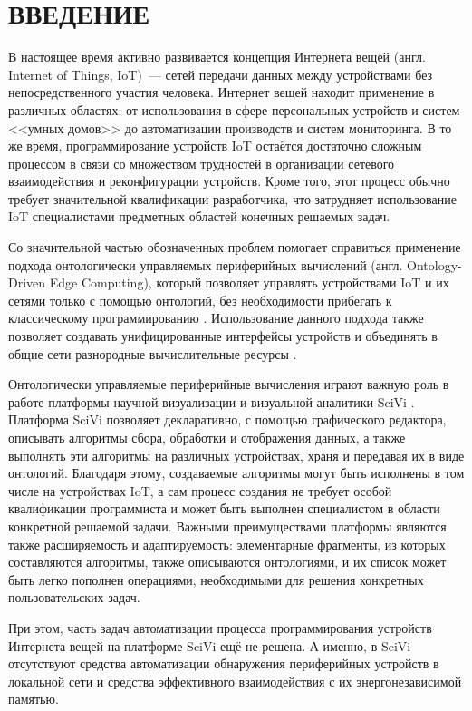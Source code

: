 \chapter*{ВВЕДЕНИЕ}

В настоящее время активно развивается концепция Интернета вещей (англ. Internet of Things, IoT)~--- сетей передачи данных между устройствами без непосредственного участия человека.
Интернет вещей находит применение в различных областях: от использования в сфере персональных устройств и систем <<умных домов>> до автоматизации производств и систем мониторинга.
В то же время, программирование устройств IoT остаётся достаточно сложным процессом в связи со множеством трудностей в организации сетевого взаимодействия и реконфигурации устройств.
Кроме того, этот процесс обычно требует значительной квалификации разработчика, что затрудняет использование IoT специалистами предметных областей конечных решаемых задач.

Со значительной частью обозначенных проблем помогает справиться применение подхода онтологически управляемых периферийных вычислений (англ. Ontology-Driven Edge Computing), который позволяет управлять устройствами IoT и их сетями только с помощью онтологий, без необходимости прибегать к классическому программированию \cite{incollection:odec}.
Использование данного подхода также позволяет создавать унифицированные интерфейсы устройств и объединять в общие сети разнородные вычислительные ресурсы \cite{incollection:eon-communications}.

Онтологически управляемые периферийные вычисления играют важную роль в работе платформы научной визуализации и визуальной аналитики SciVi \cite{article:scivi, article:scivi-overview}.
Платформа SciVi позволяет декларативно, с помощью графического редактора, описывать алгоритмы сбора, обработки и отображения данных, а также выполнять эти алгоритмы на различных устройствах, храня и передавая их в виде онтологий.
Благодаря этому, создаваемые алгоритмы могут быть исполнены в том числе на устройствах IoT, а сам процесс создания не требует особой квалификации программиста и может быть выполнен специалистом в области конкретной решаемой задачи.
Важными преимуществами платформы являются также расширяемость и адаптируемость: элементарные фрагменты, из которых составляются алгоритмы, также описываются онтологиями, и их список может быть легко пополнен операциями, необходимыми для решения конкретных пользовательских задач.

При этом, часть задач автоматизации процесса программирования устройств Интернета вещей на платформе SciVi ещё не решена. А именно, в SciVi отсутствуют средства автоматизации обнаружения периферийных устройств в локальной сети и средства эффективного взаимодействия с их энергонезависимой памятью.


